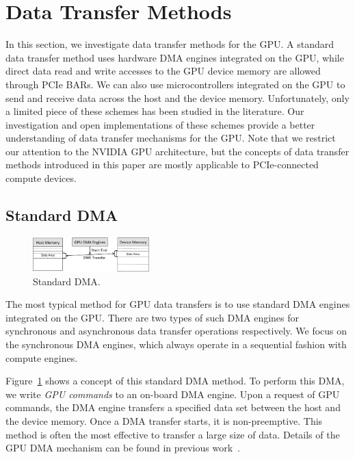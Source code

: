 \section{Data Transfer Methods}
\label{sec:data_transfer_methods}

In this section, we investigate data transfer methods for the GPU.
A standard data transfer method uses hardware DMA engines integrated on
the GPU, while direct data read and write accesses to the GPU device
memory are allowed through PCIe BARs.
We can also use microcontrollers integrated on the GPU to send and
receive data across the host and the device memory.
Unfortunately, only a limited piece of these schemes has been studied in
the literature.
Our investigation and open implementations of these schemes provide a
better understanding of data transfer mechanisms for the GPU.
Note that we restrict our attention to the NVIDIA GPU architecture, but
the concepts of data transfer methods introduced in this paper are
mostly applicable to PCIe-connected compute devices.

\subsection{Standard DMA}
\label{sec:dma}

\begin{figure}[!t]
 \centering
 \includegraphics[width=0.4\textwidth]{figure/Method/DMA_Method.pdf}
 \caption{Standard DMA.}
 \label{fig:dma}
\end{figure}

The most typical method for GPU data transfers is to use standard DMA
engines integrated on the GPU.
There are two types of such DMA engines for synchronous and asynchronous
data transfer operations respectively.
We focus on the synchronous DMA engines, which always operate in a
sequential fashion with compute engines.

Figure~\ref{fig:dma} shows a concept of this standard DMA method.
To perform this DMA, we write \textit{GPU commands} to an on-board DMA
engine.
Upon a request of GPU commands, the DMA engine transfers a specified
data set between the host and the device memory.
Once a DMA transfer starts, it is non-preemptive.
This method is often the most effective to transfer a large size of
data.
Details of the GPU DMA mechanism can be found in previous
work~\cite{Kato_ATC11, Kato_ATC12}.

